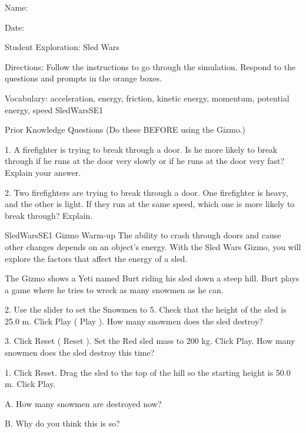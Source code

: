 ﻿Name:
	

	Date:
	

	

Student Exploration: Sled Wars


Directions: Follow the instructions to go through the simulation. Respond to the questions and prompts in the orange boxes.


Vocabulary: acceleration, energy, friction, kinetic energy, momentum, potential energy, speed
 SledWarsSE1 

Prior Knowledge Questions (Do these BEFORE using the Gizmo.)


1. A firefighter is trying to break through a door. Is he more likely to break through if he runs at the door very slowly or if he runs at the door very fast? Explain your answer.




	

2. Two firefighters are trying to break through a door. One firefighter is heavy, and the other is light. If they run at the same speed, which one is more likely to break through? Explain.




	                                                                                                         SledWarsSE1 
Gizmo Warm-up
The ability to crash through doors and cause other changes depends on an object’s energy. With the Sled Wars Gizmo, you will explore the factors that affect the energy of a sled.


The Gizmo shows a Yeti named Burt riding his sled down a steep hill. Burt plays a game where he tries to wreck as many snowmen as he can. 




2. Use the slider to set the Snowmen to 5. Check that the height of the sled is 25.0 m. Click Play ( Play ). How many snowmen does the sled destroy?
	

	   3. Click Reset ( Reset ). Set the Red sled mass to 200 kg. Click Play. How many snowmen does the sled destroy this time?
	

	

      1. Click Reset. Drag the sled to the top of the hill so the starting height is 50.0 m. Click Play. 


A. How many snowmen are destroyed now?
	

	B. Why do you think this is so?
	

	







